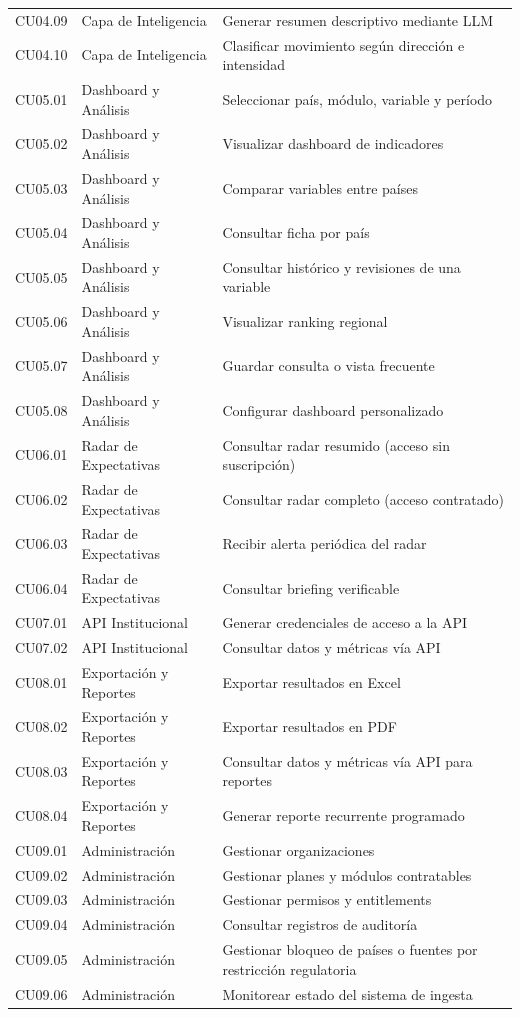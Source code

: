 \documentclass[11pt,a4paper]{article}
\begin{document}
\begin{longtable}{@{}>{\raggedright\arraybackslash}p{2.2cm} >{\raggedright\arraybackslash}p{4.3cm} >{\raggedright\arraybackslash}p{\dimexpr\textwidth-2.2cm-4.3cm-6\tabcolsep\relax}@{}}
CU04.09 & Capa de Inteligencia & Generar resumen descriptivo mediante LLM \\
CU04.10 & Capa de Inteligencia & Clasificar movimiento seg\'un direcci\'on e intensidad \\
\midrule
CU05.01 & Dashboard y An\'alisis & Seleccionar pa\'is, m\'odulo, variable y per\'iodo \\
CU05.02 & Dashboard y An\'alisis & Visualizar dashboard de indicadores \\
CU05.03 & Dashboard y An\'alisis & Comparar variables entre pa\'ises \\
CU05.04 & Dashboard y An\'alisis & Consultar ficha por pa\'is \\
CU05.05 & Dashboard y An\'alisis & Consultar hist\'orico y revisiones de una variable \\
CU05.06 & Dashboard y An\'alisis & Visualizar ranking regional \\
CU05.07 & Dashboard y An\'alisis & Guardar consulta o vista frecuente \\
CU05.08 & Dashboard y An\'alisis & Configurar dashboard personalizado \\
\midrule
CU06.01 & Radar de Expectativas & Consultar radar resumido (acceso sin suscripci\'on) \\
CU06.02 & Radar de Expectativas & Consultar radar completo (acceso contratado) \\
CU06.03 & Radar de Expectativas & Recibir alerta peri\'odica del radar \\
CU06.04 & Radar de Expectativas & Consultar briefing verificable \\
\midrule
CU07.01 & API Institucional & Generar credenciales de acceso a la API \\
CU07.02 & API Institucional & Consultar datos y m\'etricas v\'ia API \\
\midrule
CU08.01 & Exportaci\'on y Reportes & Exportar resultados en Excel \\
CU08.02 & Exportaci\'on y Reportes & Exportar resultados en PDF \\
CU08.03 & Exportaci\'on y Reportes & Consultar datos y m\'etricas v\'ia API para reportes \\
CU08.04 & Exportaci\'on y Reportes & Generar reporte recurrente programado \\
\midrule
CU09.01 & Administraci\'on & Gestionar organizaciones \\
CU09.02 & Administraci\'on & Gestionar planes y m\'odulos contratables \\
CU09.03 & Administraci\'on & Gestionar permisos y entitlements \\
CU09.04 & Administraci\'on & Consultar registros de auditor\'ia \\
CU09.05 & Administraci\'on & Gestionar bloqueo de pa\'ises o fuentes por restricci\'on regulatoria \\
CU09.06 & Administraci\'on & Monitorear estado del sistema de ingesta \\
\end{longtable}
\renewcommand{\arraystretch}{1}
\end{document}
